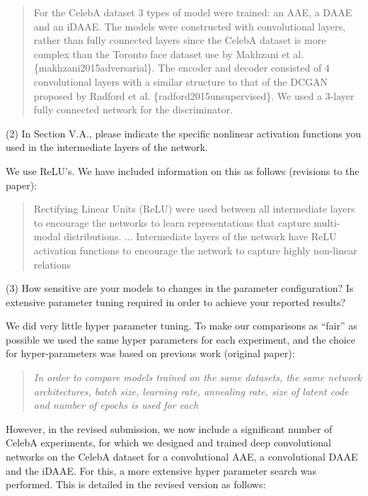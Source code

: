 \documentclass[a4paper,11pt]{article}
\begin{document}
\begin{quote}
For the CelebA dataset $3$ types of model were trained: an AAE, a DAAE and an iDAAE. The models were constructed with convolutional layers, rather than fully connected layers since the CelebA dataset is more complex than the Toronto face dataset use by Makhzani et al. \{makhzani2015adversarial\}. The encoder and decoder consisted of $4$ convolutional layers with a similar structure to that of the DCGAN proposed by Radford et al. \{radford2015unsupervised\}. We used a $3$-layer fully connected network for the discriminator. 
\end{quote}

{\color{blue}
(2) In Section V.A., please indicate the specific nonlinear activation functions you used in the intermediate layers of the network.}\newline


We use ReLU's. We have included information on this as follows (revisions to the paper):
    \begin{quote}
        {\color{red} Rectifying Linear Units (ReLU) were used between all intermediate layers to encourage the networks to learn representations that capture multi-modal distributions.} \newline
        ... \newline
            {\color{red}Intermediate layers of the network have ReLU activation functions to encourage the network to capture highly non-linear relations}
    \end{quote}


{\color{blue}
(3) How sensitive are your models to changes in the parameter configuration? Is extensive parameter tuning required in order to achieve your reported results?}\newline


We did very little hyper parameter tuning. To make our comparisons as ``fair'' as possible we used the same hyper parameters for each experiment, and the choice for hyper-parameters was based on previous work (original paper):
    
    \begin{quote}
        {\it In  order  to  compare  models trained on the same datasets, the same network architectures, batch size, learning rate, annealing rate, size of latent code and number of epochs is used for each}
    \end{quote}

However, in the revised submission, we now include a significant number of CelebA experiments, for which we designed and trained deep convolutional networks on the CelebA dataset for a convolutional AAE, a convolutional DAAE and the iDAAE. For this, a more extensive hyper parameter search was performed. This is detailed in the revised version as follows:
\end{document}
